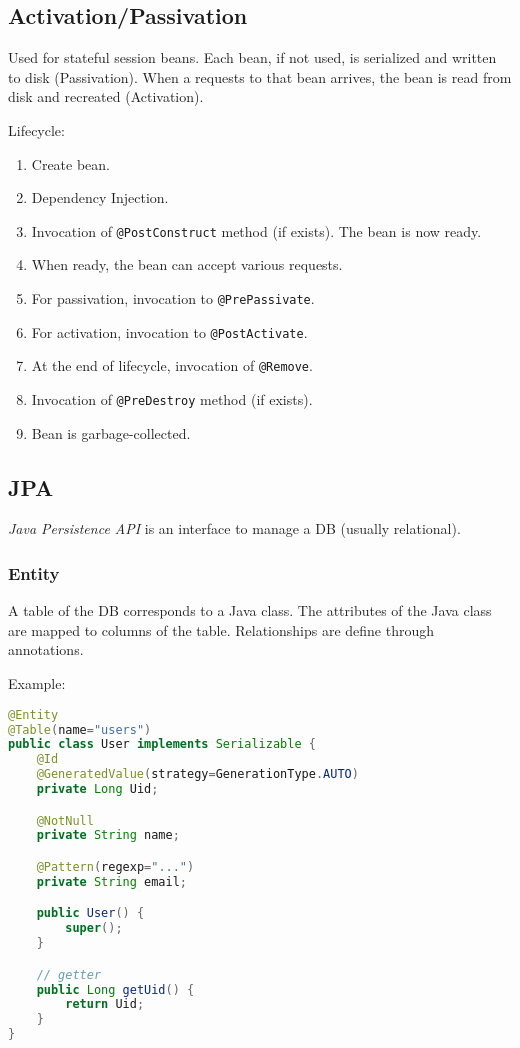 \subsection{Activation/Passivation}
Used for stateful session beans.
Each bean, if not used, is serialized and written to disk (Passivation).
When a requests to that bean arrives, the bean is read from disk and recreated (Activation).

Lifecycle:
\begin{enumerate}
    \item Create bean.
    \item Dependency Injection.
    \item Invocation of \lstinline{@PostConstruct} method (if exists).
    The bean is now ready.
    \item When ready, the bean can accept various requests.
    \item For passivation, invocation to \lstinline{@PrePassivate}.
    \item For activation, invocation to \lstinline{@PostActivate}.
    \item At the end of lifecycle, invocation of \lstinline{@Remove}.
    \item Invocation of \lstinline{@PreDestroy} method (if exists).
    \item Bean is garbage-collected.
\end{enumerate}

\subsection{JPA}
\emph{Java Persistence API} is an interface to manage a DB (usually relational).

\subsubsection{Entity}
A table of the DB corresponds to a Java class.
The attributes of the Java class are mapped to columns of the table.
Relationships are define through annotations.

Example:
\begin{lstlisting}[language=Java]
@Entity
@Table(name="users")
public class User implements Serializable {
    @Id
    @GeneratedValue(strategy=GenerationType.AUTO)
    private Long Uid;

    @NotNull
    private String name;

    @Pattern(regexp="...")
    private String email;

    public User() {
        super();
    }

    // getter
    public Long getUid() {
        return Uid;
    }
}
\end{lstlisting}

